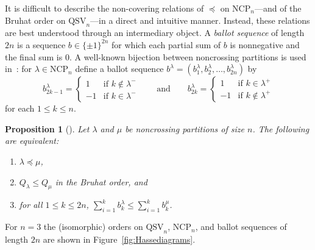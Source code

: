 \documentclass[12pt]{amsart}
\newtheorem{prop}[equation]{Proposition}
\theoremstyle{definition}
\theoremstyle{remark}
\numberwithin{equation}{section}
\newcommand{\QSV}{\mathrm{QSV}}
\newcommand{\NCP}{\mathrm{NCP}}
\begin{document}
It is difficult to describe the non-covering relations of $\preceq$ on $\NCP_{n}$---and of the Bruhat order on $\QSV_{n}$---in a direct and intuitive manner.  Instead, these relations are best understood through an intermediary object.  A \emph{ballot sequence} of length $2n$ is a sequence $b \in \{\pm1\}^{2n}$ for which each partial sum of $b$ is nonnegative and the final sum is $0$.  A well-known bijection between noncrossing partitions is used in~\cite[Section~5.1]{GobetWilliams}: for $\lambda \in \NCP_{n}$ define a ballot sequence $b^{\lambda} = (b^{\lambda}_{1}, b^{\lambda}_{2}, \ldots, b^{\lambda}_{2n})$  by
\[
b^{\lambda}_{2 k - 1} = \begin{cases} 1 & \text{if $k \notin \lambda^{-}$} \\ -1 & \text{if $k \in \lambda^{-}$} \end{cases}
\qquad
\text{and}
\qquad
b^{\lambda}_{2 k} = \begin{cases} 1 & \text{if $k \in \lambda^{+}$} \\ -1 & \text{if $k \notin \lambda^{+}$} \end{cases}
\]
for each $1 \le k \le n$.

\begin{prop}[{\cite[Theorem 1.1 and Corollary 7.5]{GobetWilliams}}]
\label{prop:QSVorderbijection}
Let $\lambda$ and $\mu$ be noncrossing partitions of size $n$.  The following are equivalent:
\begin{enumerate}[itemsep =1ex]
\item $\lambda \preceq \mu$, 

\item $Q_{\lambda} \le Q_{\mu}$ in the Bruhat order, and

\item for all $1 \le k \le 2n$, $\sum_{i = 1}^{k} b^{\lambda}_{k} \le \sum_{i = 1}^{k} b^{\mu}_{k}$.

\end{enumerate}
\end{prop}

For $n = 3$ the (isomorphic) orders on $\QSV_{n}$, $\NCP_{n}$, and ballot sequences of length $2n$ are shown in Figure~\ref{fig:Hassediagrams}.
\end{document}
